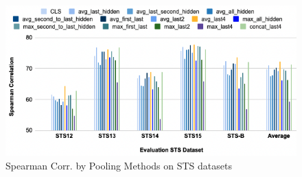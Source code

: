 \documentclass[10pt,twocolumn,letterpaper]{article}
\begin{document}
\begin{appendices}
\begin{figure}[hbt!]
\centering
\includegraphics[scale=0.35]{images/Results-Evaluation-Score-by-Pooling-Methods.png}
\caption{Spearman Corr. by Pooling Methods on STS datasets}
\label{fig:short}
\end{figure}

\end{appendices}


\small{


}
\end{document}
